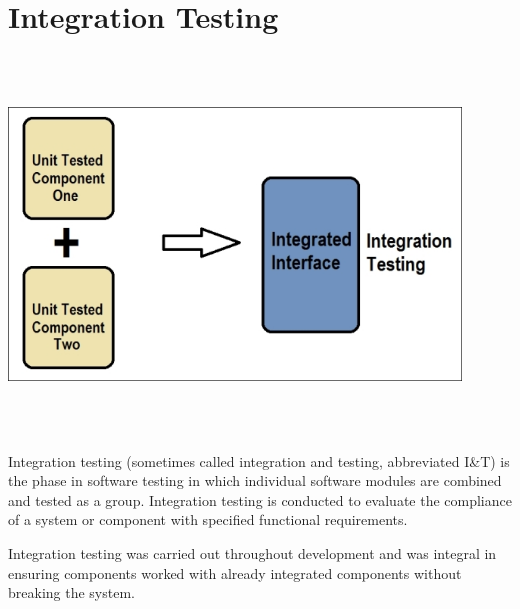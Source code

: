 \section{Integration Testing}
\begin{center}
    \includegraphics[width=12cm,height=10cm,keepaspectratio]{images/integration}
\end{center}
Integration testing (sometimes called integration and testing, abbreviated I&T) 
is the phase in software testing in which individual software modules are 
combined and tested as a group. Integration testing is conducted to evaluate the
compliance of a system or component with specified functional requirements.
\par
\bigskip
Integration testing was carried out throughout development and was integral in ensuring components worked with already integrated components without breaking the system.

